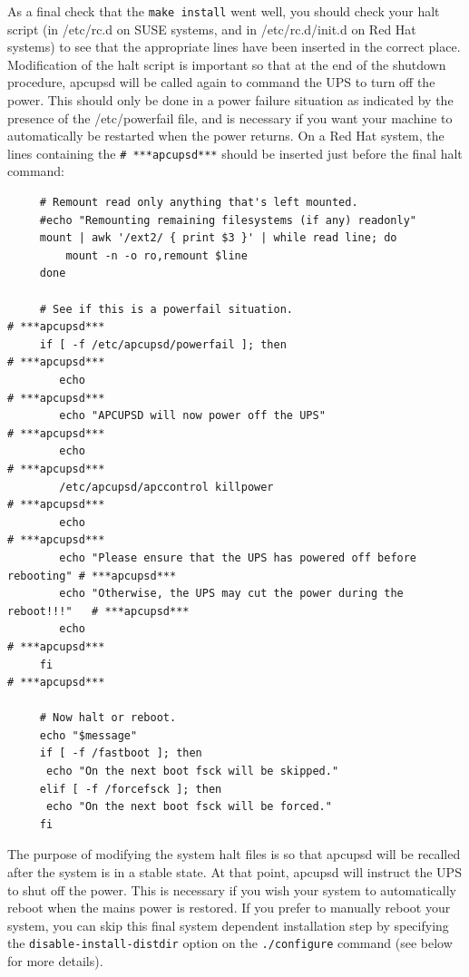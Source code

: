 As a final check that the {\tt make install} went well, you should check your
halt script (in /etc/rc.d on SUSE systems, and in /etc/rc.d/init.d on Red Hat
systems) to see that the appropriate lines have been inserted in the correct
place. Modification of the halt script is important so that at the end of the
shutdown procedure, apcupsd will be called again to command the UPS to turn
off the power. This should only be done in a power failure situation as
indicated by the presence of the /etc/powerfail file, and is necessary if you
want your machine to automatically be restarted when the power returns. On a
Red Hat system, the lines containing the {\tt \# ***apcupsd***} should be
inserted just before the final halt command: 

\footnotesize
\begin{verbatim}
     # Remount read only anything that's left mounted.
     #echo "Remounting remaining filesystems (if any) readonly"
     mount | awk '/ext2/ { print $3 }' | while read line; do
         mount -n -o ro,remount $line
     done
     
     # See if this is a powerfail situation.                               # ***apcupsd***
     if [ -f /etc/apcupsd/powerfail ]; then                                # ***apcupsd***
        echo                                                               # ***apcupsd***
        echo "APCUPSD will now power off the UPS"                          # ***apcupsd***
        echo                                                               # ***apcupsd***
        /etc/apcupsd/apccontrol killpower                                  # ***apcupsd***
        echo                                                               # ***apcupsd***
        echo "Please ensure that the UPS has powered off before rebooting" # ***apcupsd***
        echo "Otherwise, the UPS may cut the power during the reboot!!!"   # ***apcupsd***
        echo                                                               # ***apcupsd***
     fi                                                                    # ***apcupsd***
     
     # Now halt or reboot.
     echo "$message"
     if [ -f /fastboot ]; then
      echo "On the next boot fsck will be skipped."
     elif [ -f /forcefsck ]; then
      echo "On the next boot fsck will be forced."
     fi
\end{verbatim}
\normalsize

The purpose of modifying the system halt files is so that apcupsd will be
recalled after the system is in a stable state. At that point, apcupsd will
instruct the UPS to shut off the power. This is necessary if you wish your
system to automatically reboot when the mains power is restored. If you prefer
to manually reboot your system, you can skip this final system dependent
installation step by specifying the {\tt disable-install-distdir} option on
the {\tt ./configure} command (see below for more details).  

